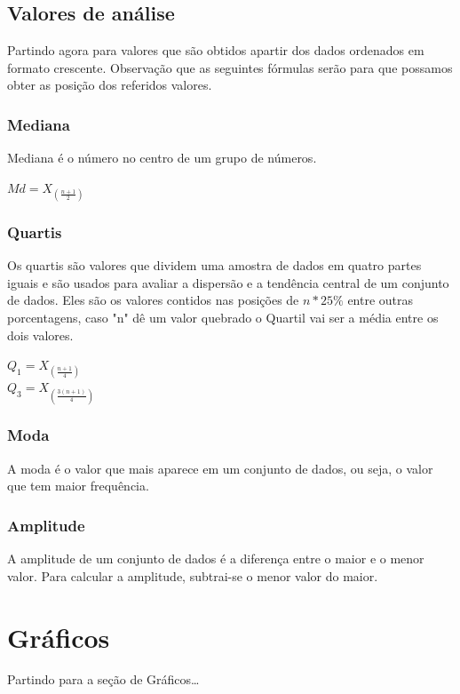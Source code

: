 \documentclass{article}
\begin{document}
\begin{multicols}{2}
  \subsection{Valores de análise}
    Partindo agora para valores que são obtidos apartir dos dados ordenados em formato crescente. 
    Observação que as seguintes fórmulas serão para que possamos obter as posição dos referidos valores.    
    
    \subsubsection{Mediana}
    Mediana é o número no centro de um grupo de números.
    \begin{center}
      $ Md = X_{(\frac{n + 1}{2})} $
    \end{center}

    \subsubsection{Quartis}
    Os quartis são valores que dividem uma amostra de dados em quatro partes iguais e são usados para 
    avaliar a dispersão e a tendência central de um conjunto de dados. Eles são os valores contidos nas 
    posições de $ n*25\% $ entre outras porcentagens, caso "n" dê um valor quebrado o Quartil vai ser a 
    média entre os dois valores.
    \begin{center}
      $ Q_1 = X_{(\frac{n + 1}{4})} $ \\
      $ Q_3 = X_{(\frac{3(n + 1)}{4})} $
    \end{center}

    \subsubsection{Moda}
    A moda é o valor que mais aparece em um conjunto de dados, ou seja, o valor que tem maior frequência.
    
    \subsubsection{Amplitude}
    A amplitude de um conjunto de dados é a diferença entre o maior e o menor valor. Para calcular a amplitude, 
    subtrai-se o menor valor do maior. 

\section{Gráficos}
  Partindo para a seção de Gráficos\dots
  

\end{multicols}
\end{document}
